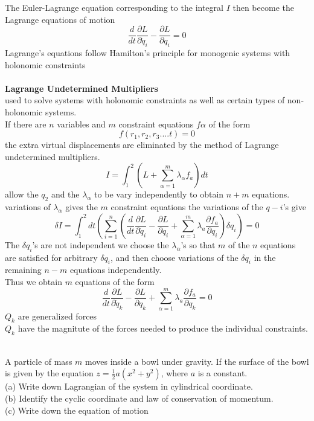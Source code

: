 The Euler-Lagrange equation corresponding to the integral $I$ then become the Lagrange equations of motion 
$$\frac{d}{d t} \frac{\partial L}{\partial \dot{q}_{i}}-\frac{\partial L}{\partial q_{i}}=0$$
Lagrange's equations follow Hamilton's principle for monogenic systems with holonomic constraints \\\\
\textbf{Lagrange Undetermined Multipliers}\\
used to solve systems with holonomic constraints as well as certain types of non-holonomic systems. \\
If there are $n$ variables and $m$ constraint equations $f\alpha$ of the form
$$f(r_1,r_2,r_3....t)=0$$
the extra virtual displacements are eliminated by the method of Lagrange undetermined multipliers.
$$I=\int_{1}^{2}\left(L+\sum_{\alpha=1}^{m} \lambda_{\alpha} f_{a}\right) d t$$
allow the $q_2$ and the $\lambda_\alpha$ to be vary independently to obtain $n+m$ equations.\\
variations of $\lambda_\alpha$ gives the $m$ constraint equations the variations of the $q-i$'s give
$$\delta I=\int_{1}^{2} d t\left(\sum_{i=1}^{n}\left(\frac{d}{d t} \frac{\partial L}{\partial \dot{q}_{i}}-\frac{\partial L}{\partial q_{i}}+\sum_{\alpha=1}^{m} \lambda_{a} \frac{\partial f_{a}}{\partial q_{i}}\right) \delta q_{i}\right)=0$$
The $\delta q_i$'s are not independent we choose the $\lambda_{\alpha}$'s so that $m$ of the $n$ equations are satisfied for arbitrary $\delta q_i$, and then choose variations of the $\delta q_i$ in the remaining $n-m$ equations independently.\\
Thus we obtain $m$ equations of the form
$$\frac{d}{d t} \frac{\partial L}{\partial \dot{q}_{k}}-\frac{\partial L}{\partial q_{k}}+\sum_{\alpha=1}^{m} \lambda_{a} \frac{\partial f_{a}}{\partial q_{k}}=0$$
$Q_k$ are generalized forces\\
$Q_k$ have the magnitute of the forces needed to produce the individual constraints.\\\\
\begin{exercise}
	 A particle of mass $m$ moves inside a bowl under gravity. If the surface of the bowl is given by the equation $z=\frac{1}{2} a\left(x^{2}+y^{2}\right)$, where $a$ is a constant.\\
	(a) Write down Lagrangian of the system in cylindrical coordinate.\\
	(b) Identify the cyclic coordinate and law of conservation of momentum.\\
	(c) Write down the equation of motion
\end{exercise}	
